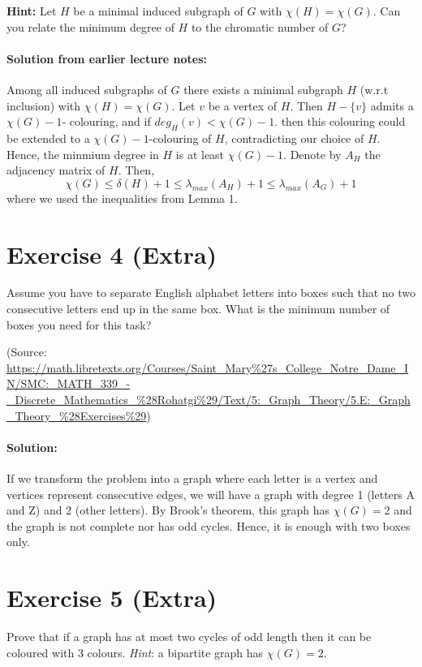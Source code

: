 \documentclass{article}
\begin{document}
\textbf{Hint:} Let $H$ be a minimal induced subgraph of $G$ with $\chi(H) = \chi(G)$. Can you relate the minimum degree of $H$ to the chromatic number of $G$?
  
\paragraph{Solution from earlier lecture notes:} Among all induced subgraphs of $G$ there exists a minimal subgraph $H$ (w.r.t inclusion) with $\chi(H)= \chi(G)$. Let $v$ be a vertex of $H$. Then $H - \{v\}$ admits a $\chi(G) - 1$- colouring, and if $deg_{H}(v) < \chi(G) - 1$. then this colouring could be extended to a $\chi(G) - 1$-colouring of $H$, contradicting our choice of $H$. Hence, the minmium degree in $H$ is at least $\chi(G) - 1$. Denote by $A_{H}$ the adjacency matrix of $H$. Then, 
$$\chi(G) \leq \delta(H) + 1 \leq \lambda_{max}(A_{H}) + 1\leq \lambda_{max}(A_{G}) + 1$$ where we used the inequalities from Lemma 1.\\

\section*{Exercise 4 (Extra)}
Assume you have to separate English alphabet letters into boxes such that no two consecutive letters end up in the same box. What is the minimum number of boxes you need for this task?

\noindent
(Source: \url {https://math.libretexts.org/Courses/Saint_Mary%27s_College_Notre_Dame_IN/SMC:_MATH_339_-_Discrete_Mathematics_%28Rohatgi%29/Text/5:_Graph_Theory/5.E:_Graph_Theory_%28Exercises%29})

\paragraph{Solution:}
If we transform the problem into a graph where each letter is a vertex and vertices represent consecutive edges, we will have a graph with degree 1 (letters A and Z) and 2 (other letters). By Brook's theorem, this graph has $\chi(G) = 2$ and the graph is not complete nor has odd cycles. Hence, it is enough with two boxes only.

\section*{Exercise 5 (Extra)}
Prove that if a graph has at most two cycles of odd length then it can be
coloured with 3 colours. \textit{Hint}: a bipartite graph has $\chi(G) = 2$.
\end{document}
